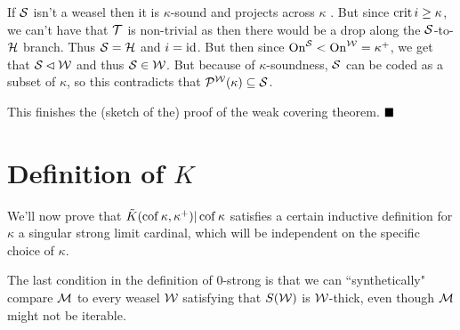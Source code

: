 \qquad If $\S$ isn't a weasel then it is $\kappa$-sound and projects across $\kappa$ \cite[Claim 5.19]{Kwithoutmeasurable}. But since $\crit i\geq\kappa$, we can't have that $\T$ is non-trivial as then there would be a drop along the $\S$-to-$\H$ branch. Thus $\S=\H$ and $i=\id$. But then since $\on^{\S}<\on^{\W}=\kappa^+$, we get that $\S\pinit\W$ and thus $\S\in\W$. But because of $\kappa$-soundness, $\S$ can be coded as a subset of $\kappa$, so this contradicts that $\P^{\W}(\kappa)\subset\S$.

\qquad This finishes the (sketch of the) proof of the weak covering theorem.
$\qed$\\

\section{Definition of $K$}

We'll now prove that $\tilde K(\cof\kappa,\kappa^+)|\cof\kappa$ satisfies a certain inductive definition for $\kappa$ a singular strong limit cardinal, which will be independent on the specific choice of $\kappa$.


The last condition in the definition of $0$-strong is that we can ``synthetically" compare $\M$ to every weasel $\W$ satisfying that $S(\W)$ is $\W$-thick, even though $\M$ might not be iterable.



